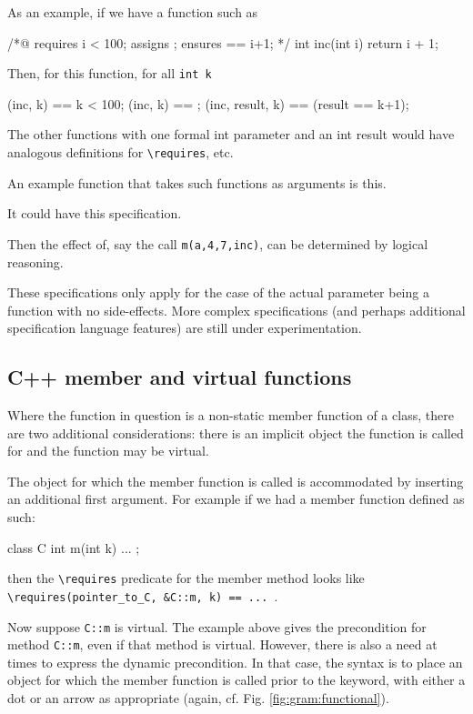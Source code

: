 As an example, if we have a function such as 
\begin{listing-nonumber}
/*@ requires i < 100;
       assigns \empty;
       ensures \result == i+1;
       */
int inc(int i) { return i + 1; }
\end{listing-nonumber}
Then, for this function, for all \lstinline|int k|
\begin{listing-nonumber}
\requires(inc, k) == k < 100;
\assigns(inc, k) == \empty;
\ensures(inc, result, k) == (result == k+1);
\end{listing-nonumber}
The other functions with one formal int parameter and an int result would have analogous definitions for \lstinline|\requires|, etc.

An example function that takes such functions as arguments is this.



It could have this specification.



Then the effect of, say the call \lstinline|m(a,4,7,inc)|, can be determined by logical reasoning.

These specifications only apply for the case of the actual parameter being a function with no side-effects. More complex specifications (and perhaps additional specification language features) are still under experimentation.

\subsection{C++ member and virtual functions}

Where the function in question is a non-static member function of a class,
there are two
additional considerations: there is an implicit object the function
is called for and the function may be virtual.

The object for which the member function is called is accommodated by inserting
an additional first argument. For example if we had a member function defined
as such:
\begin{listing-nonumber}
class C {
  int m(int k) { ... }
};
\end{listing-nonumber}
then the  \lstinline|\requires| predicate for the member method looks like \lstinline|\requires(pointer_to_C, &C::m, k) == ... |.

Now suppose \lstinline|C::m| is virtual. The example above gives the
precondition for method \lstinline|C::m|, even if that method is
virtual. However, there is also a need at times to express the dynamic
precondition. In that case, the syntax is to place an object for which
the member function is called prior to
the keyword, with either a dot or an arrow as appropriate (again,
cf. Fig. \ref{fig:gram:functional}).


